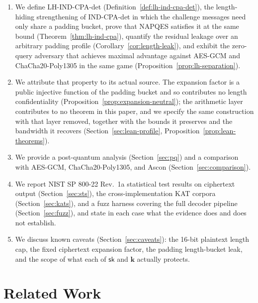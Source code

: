 \documentclass[11pt,a4paper]{article}
\begin{document}
\begin{enumerate}
        padded-length bucket alone (Lemma~\ref{lem:length-det}) — never of
        message content within a bucket, the nonce, or the associated data.
  \item We define LH-IND-CPA-det (Definition~\ref{def:lh-ind-cpa-det}), the
        length-hiding strengthening of IND-CPA-det in which the challenge
        messages need only share a padding bucket, prove that NAPQES
        satisfies it at the same bound (Theorem~\ref{thm:lh-ind-cpa}),
        quantify the residual leakage over an arbitrary padding profile
        (Corollary~\ref{cor:length-leak}), and exhibit the zero-query
        adversary that achieves maximal advantage against AES-GCM and
        ChaCha20-Poly1305 in the same game
        (Proposition~\ref{prop:lh-separation}).
  \item We attribute that property to its actual source. The expansion
        factor is a public injective function of the padding bucket and so
        contributes no length confidentiality
        (Proposition~\ref{prop:expansion-neutral}); the arithmetic layer
        contributes to no theorem in this paper, and we specify the same
        construction with that layer removed, together with the bounds it
        preserves and the bandwidth it recovers
        (Section~\ref{sec:lean-profile},
        Proposition~\ref{prop:lean-theorems}).
  \item We provide a post-quantum analysis (Section~\ref{sec:pq}) and a
        comparison with AES-GCM, ChaCha20-Poly1305, and Ascon
        (Section~\ref{sec:comparison}).
  \item We report NIST SP 800-22 Rev.\ 1a statistical test results on
        ciphertext output (Section~\ref{sec:sts}), the cross-implementation
        KAT corpora
        (Section~\ref{sec:kats}), and a fuzz harness covering the full
        decoder pipeline (Section~\ref{sec:fuzz}), and state in each case
        what the evidence does and does not establish.
  \item We discuss known caveats (Section~\ref{sec:caveats}): the 16-bit
        plaintext length cap, the fixed ciphertext expansion factor, the
        padding length-bucket leak, and the scope of what each of
        $\mathsf{sk}$ and $\mathbf{k}$ actually protects.
\end{enumerate}

\section{Related Work}
\label{sec:related}
\end{document}
